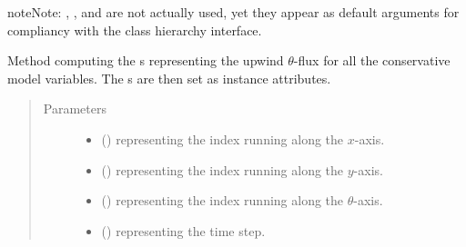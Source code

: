 \documentclass[letterpaper,10pt,english]{sphinxmanual}
\begin{document}
\begin{fulllineitems}
\begin{fulllineitems}
\begin{quote}
\begin{description}
\begin{itemize}
\end{itemize}

\end{description}\end{quote}

\begin{sphinxadmonition}{note}{Note:}
, , and  are not actually used, yet they appear
as default arguments for compliancy with the class hierarchy interface.
\end{sphinxadmonition}

\end{fulllineitems}


\begin{fulllineitems}
\label{\detokenize{api:tasmania.dycore.flux_isentropic_upwind.FluxIsentropicUpwind._compute_vertical_fluxes}}
Method computing the s representing the upwind \(\theta\)-flux
for all the conservative model variables.
The s are then set as instance attributes.
\begin{quote}\begin{description}
\item[{Parameters}] \leavevmode\begin{itemize}
\item {} 
 () \textendash{}  representing the index running along the \(x\)-axis.

\item {} 
 () \textendash{}  representing the index running along the \(y\)-axis.

\item {} 
 () \textendash{}  representing the index running along the \(\theta\)-axis.

\item {} 
 () \textendash{}  representing the time step.


\end{itemize}
\end{description}
\end{quote}
\end{fulllineitems}
\end{fulllineitems}
\end{document}
